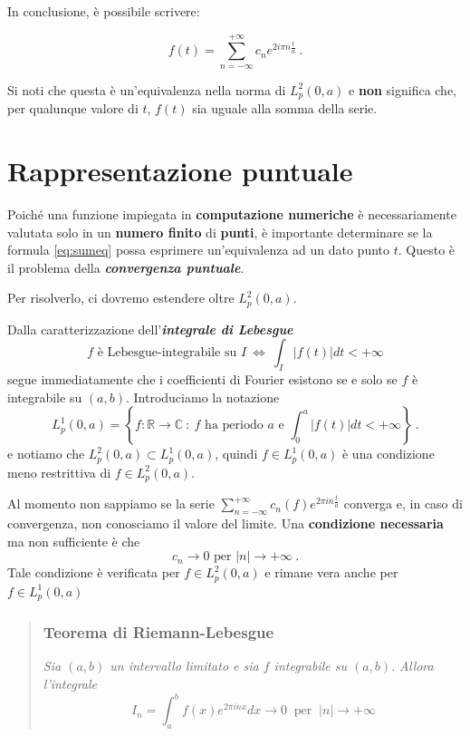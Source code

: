 \documentclass[
]{book}
\begin{document}
In conclusione, è possibile scrivere:

\begin{equation}
  f(t) = \sum_{n= - \infty}^{+ \infty} c_n e^{2 i \pi n \textstyle \frac {t}{a}} \ .
  \label{eq:sumeq}
\end{equation}

Si noti che questa è un'equivalenza nella norma di \(L_{p}^{2}(0,a)\) e \textbf{non} significa che, per qualunque valore di \(t\), \(f(t)\) sia uguale alla somma della serie.

\hypertarget{rapprpunt}{%
\section{Rappresentazione puntuale}\label{rapprpunt}}

Poiché una funzione impiegata in \textbf{computazione numeriche} è necessariamente valutata solo in un \textbf{numero finito} di \textbf{punti}, è importante determinare se la formula \eqref{eq:sumeq} possa esprimere un'equivalenza ad un dato punto \(t\).
Questo è il problema della \emph{\textbf{convergenza puntuale}}.

Per risolverlo, ci dovremo estendere oltre \(L^2_p(0,a)\).

Dalla caratterizzazione dell'\emph{\textbf{integrale di Lebesgue}}
\[ f \text{ è Lebesgue-integrabile su } I \ \iff \ \int_{I}|f(t)|dt < +\infty \]
segue immediatamente che i coefficienti di Fourier esistono se e solo se \(f\) è integrabile su \((a,b)\).
Introduciamo la notazione
\[L_{p}^{1}(0,a) = \left\{ f : \mathbb{R} \longrightarrow \mathbb{C} \ : \ f \text{ ha periodo } a  \text{ e } \int_{0}^{a}|f(t)|dt < +\infty \right\} \ .\]
e notiamo che \(L_p^2(0,a) \subset L_p^1(0,a)\), quindi \(f \in L_p^1(0,a)\) è una condizione meno restrittiva di \(f \in L_p^2(0,a)\).

Al momento non sappiamo se la serie \(\sum_{n=-\infty}^{+\infty}c_n(f)e^{2\pi in\frac{t}{a}}\) converga e, in caso di convergenza, non conosciamo il valore del limite.
Una \textbf{condizione necessaria} ma non sufficiente è che \[c_n \rightarrow 0 \text{ per } |n| \rightarrow + \infty \ .\]
Tale condizione è verificata per \(f \in L_p^2(0,a)\) e rimane vera anche per \(f \in L_p^1(0,a)\)

\begin{quote}
\hypertarget{teorema-di-riemann-lebesgue}{%
\subsubsection*{Teorema di Riemann-Lebesgue}\label{teorema-di-riemann-lebesgue}}

\emph{Sia \((a,b)\) un intervallo limitato e sia \(f\) integrabile su \((a,b)\).}
\emph{Allora l'integrale}
\[ I_n = \int_{a}^{b}f(x)e^{2 \pi in x} dx \rightarrow 0 \ \text{ per } \ |n| \rightarrow + \infty \]
\end{quote}
\end{document}
